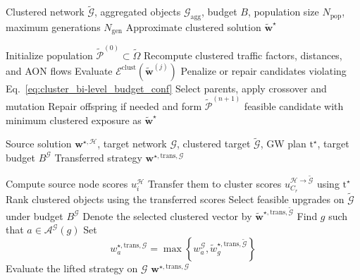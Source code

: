 \documentclass[lettersize,journal]{IEEEtran}
\begin{document}
\begin{algorithm}[t]
\caption{GA for the clustered optimization problem}
\label{alg:ga_clustered}
\begin{algorithmic}[1]
\Require Clustered network $\tilde{\mathcal{G}}$, aggregated objects
$\mathcal{G}_{\mathrm{agg}}$, budget $B$, population size $N_{\mathrm{pop}}$,
maximum generations $N_{\mathrm{gen}}$
\Ensure Approximate clustered solution $\tilde{\mathbf{w}}^{\star}$

\State Initialize population $\tilde{\mathcal{P}}^{(0)}\subset\tilde{\Omega}$
        \State Recompute clustered traffic factors, distances, and AON flows
        \State Evaluate $\mathcal{E}^{\mathrm{clust}}(\tilde{\mathbf{w}}^{(j)})$
        \State Penalize or repair candidates violating Eq.~\eqref{eq:cluster_bi-level_budget_conf}
    \EndFor
    \State Select parents, apply crossover and mutation
    \State Repair offspring if needed and form $\tilde{\mathcal{P}}^{(n+1)}$
\EndFor
\State \Return feasible candidate with minimum clustered exposure as
$\tilde{\mathbf{w}}^{\star}$
\end{algorithmic}
\end{algorithm}

\begin{algorithm}[t]
\caption{GW-based transfer and lifting of upgrade strategies}
\label{alg:gw_transfer}
\begin{algorithmic}[1]
\Require Source solution $\mathbf{w}^{\star,\mathcal{H}}$, target network
$\mathcal{G}$, clustered target $\tilde{\mathcal{G}}$, GW plan
$\mathrm{t}^{\star}$, target budget $B^{\mathcal{G}}$
\Ensure Transferred strategy $\mathbf{w}^{\star,\mathrm{trans},\mathcal{G}}$

\State Compute source node scores $u_i^{\mathcal{H}}$
\State Transfer them to cluster scores
$u_{C_r}^{\mathcal{H}\rightarrow\tilde{\mathcal{G}}}$ using $\mathrm{t}^{\star}$
\State Rank clustered objects using the transferred scores
\State Select feasible upgrades on $\tilde{\mathcal{G}}$ under budget $B^{\mathcal{G}}$
\State Denote the selected clustered vector by
$\tilde{\mathbf{w}}^{\star,\mathrm{trans},\tilde{\mathcal{G}}}$
    \State Find $g$ such that $a\in\mathcal{A}^{\mathcal{G}}(g)$
    \State Set
    \[
    w_a^{\star,\mathrm{trans},\mathcal{G}}
    =
    \max\left\{
    w_a^{\mathcal{G}},
    \tilde{w}_g^{\star,\mathrm{trans},\tilde{\mathcal{G}}}
    \right\}
    \]
\EndFor
\State Evaluate the lifted strategy on $\mathcal{G}$
\State \Return
$\mathbf{w}^{\star,\mathrm{trans},\mathcal{G}}$
\end{algorithmic}
\end{algorithm}
\end{document}
